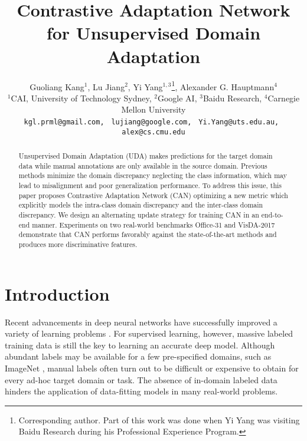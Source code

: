 \documentclass[10pt,twocolumn,letterpaper]{article}
\begin{document}
\title{Contrastive Adaptation Network for Unsupervised Domain Adaptation}

\author{Guoliang Kang$^{1}$, Lu Jiang$^2$, 
Yi Yang$^{1,3}$\thanks{
Corresponding author. Part of this work was done when Yi Yang was visiting Baidu Research during his Professional Experience Program.}, 
Alexander G. Hauptmann$^4$\\
$^1$CAI, University of Technology Sydney, 
$^2$Google AI, 
$^3$Baidu Research, 
$^4$Carnegie Mellon University
\\
{\tt\small kgl.prml@gmail.com, }
{\tt\small lujiang@google.com, }
{\tt\small Yi.Yang@uts.edu.au, }
{\tt\small alex@cs.cmu.edu}
}

\newcommand{\lu}[1]{{\color{red}{(lu: #1)}}}
\newcommand{\kang}[1]{{\color{blue}{(kang: #1)}}}


\newcommand{\x}{\boldsymbol{x}}
\newcommand{\X}{\boldsymbol{X}}
\newcommand{\ibf}[1]{\textit{\textbf{#1}}}
\newcommand{\pl}{\phi_l}
\newcommand{\kl}{k_l}
\newcommand{\De}{\hat{\mathcal{D}}}
\newcommand{\D}{\mathcal{D}}

\maketitle


\begin{abstract}
Unsupervised Domain Adaptation (UDA) makes predictions for the target domain data while manual annotations are only available in the source domain. Previous methods minimize the domain discrepancy neglecting the class information, which may lead to misalignment and poor generalization performance. To address this issue, this paper proposes Contrastive Adaptation Network (CAN) optimizing a new metric which explicitly models the intra-class domain discrepancy and the inter-class domain discrepancy. We design an alternating update strategy for training CAN in an end-to-end manner. Experiments on two real-world benchmarks Office-31 and VisDA-2017 demonstrate that CAN performs favorably against the state-of-the-art methods and produces more discriminative features.
\end{abstract}

\section{Introduction}
Recent advancements in deep neural networks have successfully improved a variety of learning problems \cite{zhu2017bidirectional,dong2019search,Yawei2019Taking,jiang2014easy,kang2018shakeout}. For supervised learning, however, massive labeled training data is still the key to learning an accurate deep model. Although abundant labels may be available for a few pre-specified domains, such as ImageNet \cite{deng2009imagenet}, manual labels often turn out to be difficult or expensive to obtain for every ad-hoc target domain or task. The absence of in-domain labeled data hinders the application of data-fitting models in many real-world problems.
\end{document}
